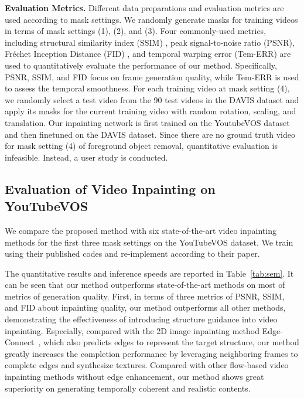 \noindent \textbf{Evaluation Metrics.} 
Different data preparations and evaluation metrics are used according to mask settings. We randomly generate masks for training videos in terms of mask settings (1), (2), and (3). 
Four commonly-used metrics, including structural similarity index (SSIM) \cite{wang2004image}, peak signal-to-noise ratio (PSNR), Fr{\'e}chet Inception Distance (FID) \cite{heusel2017gans}, and temporal warping error (Tem-ERR) \cite{Kim_2019_CVPR} are used to quantitatively evaluate the performance of our method. 
{\color{blue}Specifically, PSNR, SSIM, and FID focus on frame generation quality, while Tem-ERR is used to assess the temporal smoothness.} 
For each training video at mask setting (4), we randomly select a test video from the 90 test videos in the DAVIS dataset and apply its masks for the current training video with random rotation, scaling, and translation.
Our inpainting network is first trained on the YoutubeVOS dataset and then finetuned on the DAVIS dataset. 
Since there are no ground truth video for mask setting (4) of foreground object removal, quantitative evaluation is infeasible. Instead, a user study is conducted.  



\subsection{Evaluation of Video Inpainting on YouTubeVOS}
We compare the proposed method with six state-of-the-art video inpainting methods \cite{nazeri2019edgeconnect,wang2019video,Kim_2019_CVPR1,Xu_2019_CVPR,lee2019copy,oh2019onion}
for the first three mask settings on the YouTubeVOS dataset.
%
We train \cite{nazeri2019edgeconnect,Xu_2019_CVPR} using their published codes and re-implement \cite{wang2019video} according to their paper. 


The quantitative results and inference speeds are reported in Table~\ref{tab:sem}.
It can be seen that our method outperforms state-of-the-art methods on most of metrics of generation quality.
First, in terms of three metrics of PSNR, SSIM, and FID about inpainting quality, our method outperforms all other methods, demonstrating the effectiveness of introducing structure guidance into video inpainting.
Especially, compared with the 2D image inpainting method Edge-Connect~\cite{nazeri2019edgeconnect}, which also predicts edges to represent the target structure, our method greatly increases the completion performance by leveraging neighboring frames to complete edges and synthesize textures. 
Compared with other flow-based video inpainting methods without edge enhancement, our method shows great superiority on generating temporally coherent and realistic contents. 

